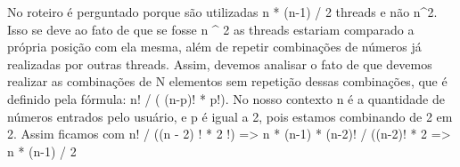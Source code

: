 No roteiro é perguntado porque são utilizadas n * (n-1) / 2 threads e não n^2. Isso se deve ao fato de que se fosse n ^ 2 as threads estariam comparado a própria posição com ela mesma, além de repetir combinações de números já realizadas por outras threads. Assim, devemos analisar o fato de que devemos realizar as combinações de N elementos sem repetição dessas combinações, que é definido pela fórmula: n! / ( (n-p)! * p!). No nosso contexto n é a quantidade de números entrados pelo usuário, e p é igual a 2, pois estamos combinando de 2 em 2. Assim ficamos com n! / ((n - 2) ! * 2 !) => n * (n-1) * (n-2)! / ((n-2)! * 2 => n * (n-1) / 2 